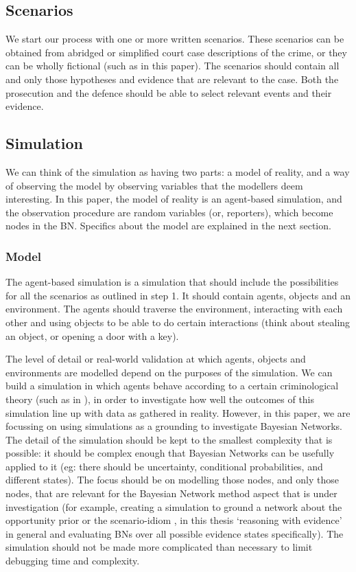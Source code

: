 \documentclass[12pt]{article}
\begin{document}
\subsection{Scenarios}
We start our process with one or more written scenarios. These scenarios can be obtained from abridged or simplified court case descriptions of the crime, or they can be wholly fictional (such as in this paper). The scenarios should contain all and only those hypotheses and evidence that are relevant to the case. Both the prosecution and the defence should be able to select relevant events and their evidence. 

\subsection{Simulation}
We can think of the simulation as having two parts: a model of reality, and a way of observing the model by observing variables that the modellers deem interesting. In this paper, the model of reality is an agent-based simulation, and the observation procedure are random variables (or, reporters), which become nodes in the BN. Specifics about the model are explained in the next section.

\subsubsection{Model}

The agent-based simulation is a simulation that should include the possibilities for all the scenarios as outlined in step 1. It should contain agents, objects and an environment. The agents should traverse the environment, interacting with each other and using objects to be able to do certain interactions (think about stealing an object, or opening a door with a key).

The level of detail or real-world validation at which agents, objects and environments are modelled depend on the purposes of the simulation. We can build a simulation in which agents behave according to a certain criminological theory (such as in \citep{Zhu2021}), in order to investigate how well the outcomes of this simulation line up with data as gathered in reality. However, in this paper, we are focussing on using simulations as a grounding to investigate Bayesian Networks. The detail of the simulation should be kept to the smallest complexity that is possible: it should be complex enough that Bayesian Networks can be usefully applied to it (eg: there should be uncertainty, conditional probabilities, and different states). The focus should be on modelling those nodes, and only those nodes, that are relevant for the Bayesian Network method aspect that is under investigation (for example, creating a simulation to ground a network about the opportunity prior \citep{Fenton2017} or the scenario-idiom \citep{vlek2016}, in this thesis `reasoning with evidence' in general and evaluating BNs over all possible evidence states specifically). The simulation should not be made more complicated than necessary to limit debugging time and complexity.
\end{document}
